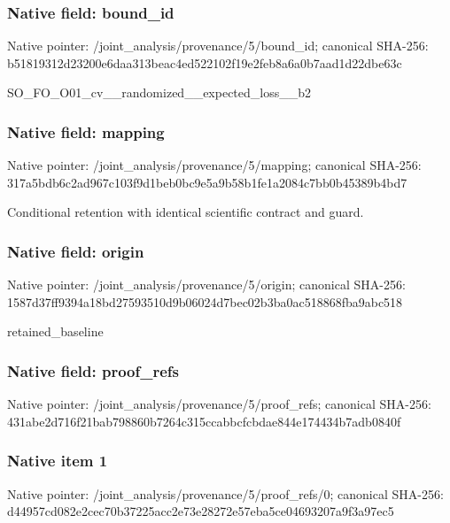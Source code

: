 \documentclass[10pt,a4paper]{article}
\begin{document}
\subsubsection{Native field: bound\_\allowbreak{}id}
Native pointer: /joint\_\allowbreak{}analysis/provenance/5/bound\_\allowbreak{}id; canonical SHA-256: b51819312d23200e6daa313beac4ed522102f19e2feb8a6a0b7aad1d22dbe63c

\begingroup\raggedright\sloppy SO\_\allowbreak{}FO\_\allowbreak{}O01\_\allowbreak{}cv\_\allowbreak{}\_\allowbreak{}randomized\_\allowbreak{}\_\allowbreak{}expected\_\allowbreak{}loss\_\allowbreak{}\_\allowbreak{}b2\par\endgroup

\subsubsection{Native field: mapping}
Native pointer: /joint\_\allowbreak{}analysis/provenance/5/mapping; canonical SHA-256: 317a5bdb6c2ad967c103f9d1beb0bc9e5a9b58b1fe1a2084c7bb0b45389b4bd7

\begingroup\raggedright\sloppy Conditional retention with identical scientific contract and guard.\par\endgroup

\subsubsection{Native field: origin}
Native pointer: /joint\_\allowbreak{}analysis/provenance/5/origin; canonical SHA-256: 1587d37ff9394a18bd27593510d9b06024d7bec02b3ba0ac518868fba9abc518

\begingroup\raggedright\sloppy retained\_\allowbreak{}baseline\par\endgroup

\subsubsection{Native field: proof\_\allowbreak{}refs}
Native pointer: /joint\_\allowbreak{}analysis/provenance/5/proof\_\allowbreak{}refs; canonical SHA-256: 431abe2d716f21bab798860b7264c315ccabbcfcbdae844e174434b7adb0840f

\subsubsection{Native item 1}
Native pointer: /joint\_\allowbreak{}analysis/provenance/5/proof\_\allowbreak{}refs/0; canonical SHA-256: d44957cd082e2cec70b37225acc2e73e28272e57eba5ce04693207a9f3a97ec5
\end{document}
